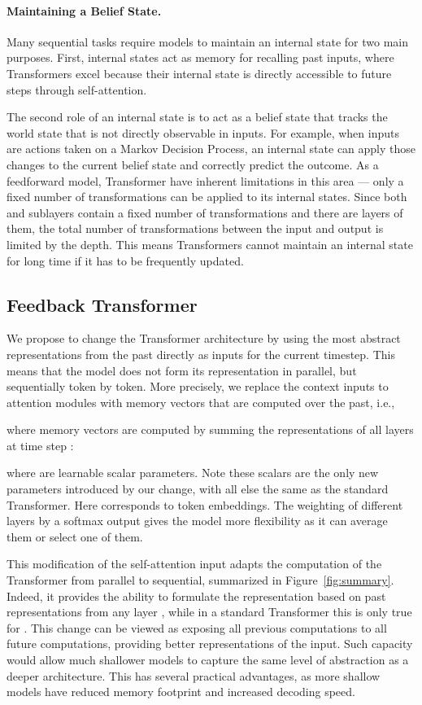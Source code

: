 \documentclass{article} \usepackage{iclr2021_conference}
\begin{document}
\paragraph{Maintaining a Belief State.} 
Many sequential tasks require models to maintain an internal state for two main purposes.
First, internal states act as memory for recalling past inputs, where Transformers excel because their internal state  is directly accessible to future steps through self-attention.

The second role of an internal state is to act as a belief state that tracks the world state that is not directly observable in inputs. 
For example, when inputs are actions taken on a Markov Decision Process, an internal state can apply those changes to the current belief state and correctly predict the outcome. 
As a feedforward model, Transformer have inherent limitations in this area --- only a fixed number of transformations can be applied to its internal states. 
Since both  and  sublayers contain a fixed number of transformations and there are  layers of them, the total number of transformations between the input and output is limited by the depth. 
This means Transformers cannot maintain an internal state for long time if it has to be frequently updated.

\subsection{Feedback Transformer}

We propose to change the Transformer architecture by using the most abstract representations from the past directly as inputs for the current timestep.
This means that the model does not form its representation in parallel, but sequentially token by token.
More precisely, we replace the context inputs to attention modules with memory vectors that are computed over the past, i.e., 

where memory vectors  are computed by summing the representations of all layers at time step :

where  are learnable scalar parameters.
Note these scalars are the only new parameters introduced by our change, with all else the same as the standard Transformer. Here  corresponds to token embeddings.
The weighting of different layers by a softmax output gives the model more flexibility as it can average them or select one of them.


This modification of the self-attention input adapts the computation of the Transformer from parallel to sequential, summarized in Figure~\ref{fig:summary}. 
Indeed, it provides the ability to formulate the representation  based on past representations from any layer , while in a standard Transformer this is only true for . 
This change can be viewed as exposing all previous computations to all future computations, providing better representations of the input.
Such capacity would allow much shallower models to capture the same level of abstraction as a deeper architecture.
This has several practical advantages, as more shallow models have reduced memory footprint and increased decoding speed.
\end{document}
